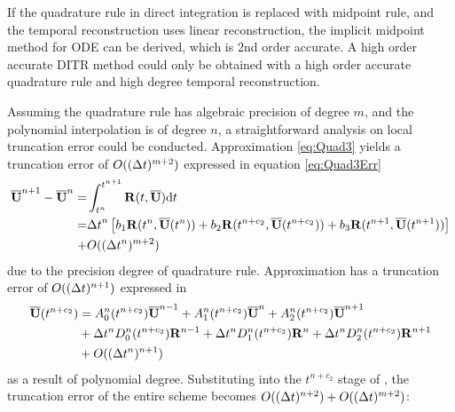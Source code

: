 If the quadrature rule in direct integration is replaced with
midpoint rule, and the temporal reconstruction uses linear
reconstruction, the implicit midpoint method for ODE can be derived,
which is 2nd order accurate. A high order accurate DITR method could
only be obtained with a high order accurate quadrature rule and
high degree temporal reconstruction.

Assuming the quadrature rule has algebraic precision
of degree $m$, and the polynomial interpolation is of degree $n$,
a straightforward analysis on local truncation error could be conducted.
Approximation \eqref{eq:Quad3} yields a
truncation error of $O((\mathrm\Delta t)^{m+2} )$ expressed in equation \eqref{eq:Quad3Err}
\begin{equation}
    \label{eq:Quad3Err}
    \begin{aligned}
        \overline{\mathbf{U}}^{n+1} - \overline{\mathbf{U}}^{n} = & \int_{t^n}^{t^{n+1}}{
        \mathbf{R}(t, \overline{\mathbf{U}})\dd t}                              \\  = &
        {\mathrm\Delta t}^{n}
        \left[
            b_1\mathbf{R}(t^n, \overline{\mathbf{U}}(t^n))
            +
            b_2\mathbf{R}(t^{n+c_2}, \overline{\mathbf{U}}(t^{n+c_2}))
            +
            b_3\mathbf{R}(t^{n+1}, \overline{\mathbf{U}}(t^{n+1}))
            \right]
        \\ + &
        O((\mathrm\Delta t^{n})^{m+2} )
    \end{aligned}
\end{equation}
due to the precision degree of quadrature rule.
Approximation
 has a truncation error of $O((\mathrm\Delta t)^{n+1})$
expressed in 
\begin{equation}
    \begin{aligned}
        \label{eq:TRErr}
        \overline{\mathbf{U}}(t^{n+c_2}) & =
        A^n_0(t^{n+c_2})\overline{\mathbf{U}}^{n - 1} +
        A^n_1(t^{n+c_2})\overline{\mathbf{U}}^{n} +
        A^n_2(t^{n+c_2})\overline{\mathbf{U}}^{n + 1}
        \\ & +
        \mathrm\Delta t^n D^n_0(t^{n+c_2})\mathbf{R}^{n - 1} +
        \mathrm\Delta t^n D^n_1(t^{n+c_2})\mathbf{R}^{n} +
        \mathrm\Delta t^n D^n_2(t^{n+c_2})\mathbf{R}^{n + 1}
        \\ & +
        O((\mathrm\Delta t^{n})^{n+1} )
    \end{aligned}
\end{equation}
as a result of polynomial degree.
Substituting  into the $t^{n+c_2}$ stage
of , the truncation error
of the entire scheme becomes $O((\mathrm\Delta t)^{n+2}) + O((\mathrm\Delta t)^{m+2})$:
